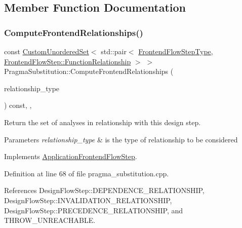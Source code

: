\subsection{Member Function Documentation}
\mbox{\label{classPragmaSubstitution_a6a22136163ca0de01d924ab826fff0d4}} 
\subsubsection{\texorpdfstring{Compute\+Frontend\+Relationships()}{ComputeFrontendRelationships()}}
{\footnotesize\ttfamily const \hyperlink{classCustomUnorderedSet}{Custom\+Unordered\+Set}$<$ std\+::pair$<$ \hyperlink{frontend__flow__step_8hpp_afeb3716c693d2b2e4ed3e6d04c3b63bb}{Frontend\+Flow\+Step\+Type}, \hyperlink{classFrontendFlowStep_af7cf30f2023e5b99e637dc2058289ab0}{Frontend\+Flow\+Step\+::\+Function\+Relationship} $>$ $>$ Pragma\+Substitution\+::\+Compute\+Frontend\+Relationships (\begin{DoxyParamCaption}\item[{const \hyperlink{classDesignFlowStep_a723a3baf19ff2ceb77bc13e099d0b1b7}{Design\+Flow\+Step\+::\+Relationship\+Type}}]{relationship\+\_\+type }\end{DoxyParamCaption}) const\hspace{0.3cm}{\ttfamily [override]}, {\ttfamily [private]}, {\ttfamily [virtual]}}



Return the set of analyses in relationship with this design step. 


\begin{DoxyParams}{Parameters}
{\em relationship\+\_\+type} & is the type of relationship to be considered \\
\hline
\end{DoxyParams}


Implements \hyperlink{classApplicationFrontendFlowStep_ab308200c0096ccff3a1ff50e864ed61f}{Application\+Frontend\+Flow\+Step}.



Definition at line 68 of file pragma\+\_\+substitution.\+cpp.



References Design\+Flow\+Step\+::\+D\+E\+P\+E\+N\+D\+E\+N\+C\+E\+\_\+\+R\+E\+L\+A\+T\+I\+O\+N\+S\+H\+IP, Design\+Flow\+Step\+::\+I\+N\+V\+A\+L\+I\+D\+A\+T\+I\+O\+N\+\_\+\+R\+E\+L\+A\+T\+I\+O\+N\+S\+H\+IP, Design\+Flow\+Step\+::\+P\+R\+E\+C\+E\+D\+E\+N\+C\+E\+\_\+\+R\+E\+L\+A\+T\+I\+O\+N\+S\+H\+IP, and T\+H\+R\+O\+W\+\_\+\+U\+N\+R\+E\+A\+C\+H\+A\+B\+LE.

